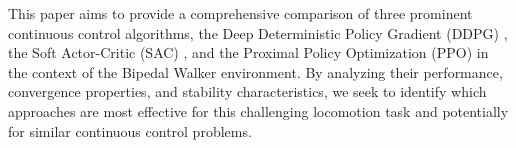 \noindent This paper aims to provide a comprehensive comparison of three prominent continuous control algorithms, the Deep Deterministic Policy Gradient (DDPG) \cite{lillicrap2019continuouscontroldeepreinforcement}, the Soft Actor-Critic (SAC) \cite{haarnoja2018softactorcriticoffpolicymaximum}, and the Proximal Policy Optimization (PPO) \cite{schulman2017proximalpolicyoptimizationalgorithms} in the context of the Bipedal Walker environment. By analyzing their performance, convergence properties, and stability characteristics, we seek to identify which approaches are most effective for this challenging locomotion task and potentially for similar continuous control problems.\\
